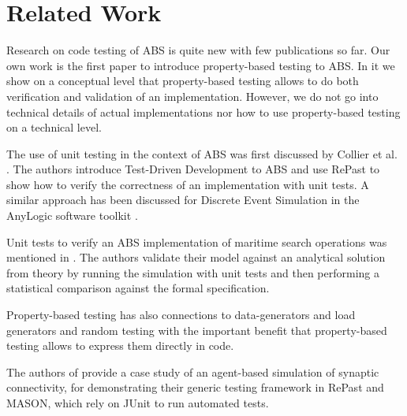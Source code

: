 \section{Related Work}
\label{sec:related}
Research on code testing of ABS is quite new with few publications so far. Our own work \cite{thaler_show_2019} is the first paper to introduce property-based testing to ABS. In it we show on a conceptual level that property-based testing allows to do both verification and validation of an implementation. However, we do not go into technical details of actual implementations nor how to use property-based testing on a technical level.

The use of unit testing in the context of ABS was first discussed by Collier et al. \cite{collier_test-driven_2013}. The authors introduce Test-Driven Development to ABS and use RePast to show how to verify the correctness of an implementation with unit tests. A similar approach has been discussed for Discrete Event Simulation in the AnyLogic software toolkit \cite{asta_investigation_2014}. 

Unit tests to verify an ABS implementation of maritime search operations was mentioned in \cite{onggo_test-driven_2016}. The authors validate their model against an analytical solution from theory by running the simulation with unit tests and then performing a statistical comparison against the formal specification.

Property-based testing has also connections to data-generators \cite{gurcan_generic_2013} and load generators and random testing \cite{burnstein_practical_2010} with the important benefit that property-based testing allows to express them directly in code.

The authors of \cite{gurcan_generic_2013} provide a case study of an agent-based simulation of synaptic connectivity, for demonstrating their generic testing framework in RePast and MASON, which rely on JUnit to run automated tests.